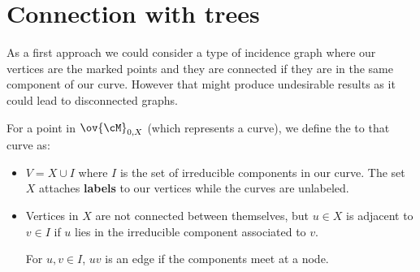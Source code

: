 \documentclass[12pt]{memoir}
\begin{document}
\section*{Connection with trees}

As a first approach we could consider a type of incidence graph where our vertices are the marked points and they are connected if they are in the same component of our curve. However that might produce undesirable results as it could lead to disconnected graphs.

\begin{Def}
For a point in $\ov{\cM}_{0,X}$ (which represents a curve), we define the  to that curve as:
\begin{itemize}
    \item $V=X\cup I$ where $I$ is the set of irreducible components in our curve. The set $X$ attaches \textbf{labels} to our vertices while the curves are unlabeled.
    \item Vertices in $X$ are not connected between themselves, but $u\in X$ is adjacent to $v\in I$ if $u$ lies in the irreducible component associated to $v$.\par 
    For $u,v\in I$, $uv$ is an edge if the components meet at a node.
\end{itemize}
\end{Def}
\end{document}
